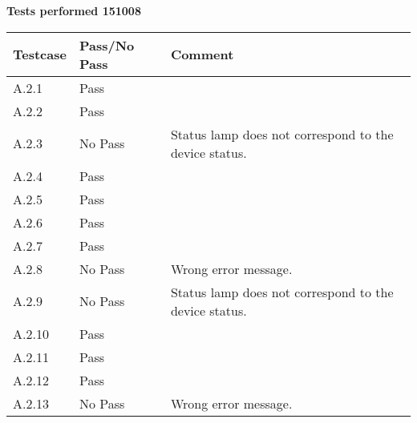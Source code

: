 \renewcommand{\testdate}{151008}
\textbf{Tests performed \testdate}
	\begin{center}
  		\begin{tabular}{| p{3cm} | p{5cm} | p{5cm} |}
    		\hline
	    	\textbf{Testcase}			& \textbf{Pass/No Pass} 	& \textbf{Comment} \\ \hline
    		A.2.1		 						& Pass 										&  				\\ \hline
    		A.2.2		 						& Pass 										& 				 \\	\hline
    		A.2.3		 						& No Pass 										& Status lamp does not correspond to the device status.				 \\	\hline
    		A.2.4		 						& Pass 										& 				 \\	\hline
    		A.2.5		 						& Pass 										& 				 \\	\hline
    		A.2.6		 						& Pass 										& 				 \\	\hline
    		A.2.7		 						& Pass 										& 				 \\	\hline
    		A.2.8		 						& No Pass 										& Wrong error message.				 \\	\hline
    		A.2.9		 						& No Pass 										& Status lamp does not correspond to the device status.				 \\	\hline
    		A.2.10	 							& Pass 										& 				 \\	\hline
    		A.2.11	 							& Pass 										& 				 \\	\hline
    		A.2.12	 							& Pass 										& 				 \\	\hline
    		A.2.13	 							& No Pass 											&  Wrong error message.				 \\	\hline
 		 \end{tabular}
	\end{center}